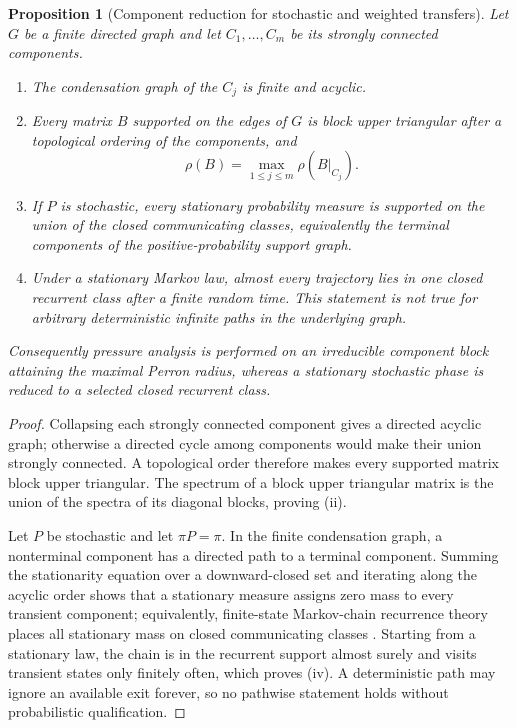 \documentclass[11pt]{article}
\newtheorem{proposition}[theorem]{Proposition}
\theoremstyle{definition}
\theoremstyle{remark}
\begin{document}
\begin{proposition}[Component reduction for stochastic and weighted transfers]
\label{prop:terminal-component}
Let $G$ be a finite directed graph and let $C_1,\ldots,C_m$ be its strongly
connected components.
\begin{enumerate}[label=\textup{(\roman*)},leftmargin=2.4em]
\item The condensation graph of the $C_j$ is finite and acyclic.
\item Every matrix $B$ supported on the edges of $G$ is block upper triangular
      after a topological ordering of the components, and
      \[
       \rho(B)=\max_{1\le j\le m}\rho(B|_{C_j}).
      \]
\item If $P$ is stochastic, every stationary probability measure is supported
      on the union of the closed communicating classes, equivalently the
      terminal components of the positive-probability support graph.
\item Under a stationary Markov law, almost every trajectory lies in one closed
      recurrent class after a finite random time.  This statement is not true
      for arbitrary deterministic infinite paths in the underlying graph.
\end{enumerate}
Consequently pressure analysis is performed on an irreducible component block
attaining the maximal Perron radius, whereas a stationary stochastic phase is
reduced to a selected closed recurrent class.
\end{proposition}

\begin{proof}
Collapsing each strongly connected component gives a directed acyclic graph;
otherwise a directed cycle among components would make their union strongly
connected.  A topological order therefore makes every supported matrix block
upper triangular.  The spectrum of a block upper triangular matrix is the union
of the spectra of its diagonal blocks, proving (ii).

Let $P$ be stochastic and let $\pi P=\pi$.  In the finite condensation graph,
a nonterminal component has a directed path to a terminal component.  Summing
the stationarity equation over a downward-closed set and iterating along the
acyclic order shows that a stationary measure assigns zero mass to every
transient component; equivalently, finite-state Markov-chain recurrence theory
places all stationary mass on closed communicating classes
\cite{Seneta2006}.  Starting from a stationary law, the chain is in the recurrent
support almost surely and visits transient states only finitely often, which
proves (iv).  A deterministic path may ignore an available exit forever, so no
pathwise statement holds without probabilistic qualification.
\end{proof}
\end{document}
